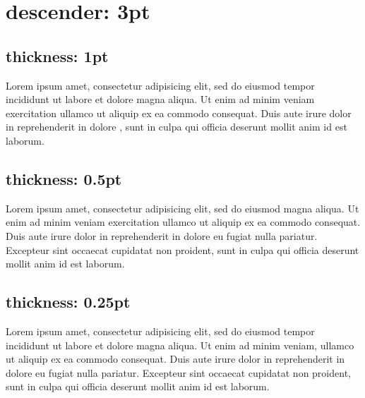 \documentclass{article}
\begin{document}
\section{descender: 3pt}

\subsection{thickness: 1pt}


Lorem ipsum  amet, consectetur adipisicing elit, sed
do eiusmod tempor incididunt ut labore et dolore magna aliqua. Ut enim
ad minim veniam exercitation ullamco  ut aliquip ex
ea commodo consequat. Duis aute irure dolor in reprehenderit in
 dolore , sunt in culpa
qui officia deserunt mollit anim id est laborum.

\subsection{thickness: 0.5pt}


Lorem ipsum  amet, consectetur adipisicing elit, sed
do eiusmod  magna aliqua.
Ut enim ad minim veniam exercitation ullamco  ut
aliquip ex ea commodo consequat. Duis aute irure dolor in reprehenderit
in  dolore eu fugiat nulla pariatur.
Excepteur sint occaecat cupidatat non proident, sunt in culpa qui
officia deserunt mollit anim id est laborum.

\subsection{thickness: 0.25pt}


Lorem ipsum  amet, consectetur adipisicing elit, sed
do eiusmod tempor incididunt ut labore et dolore magna aliqua. Ut enim
ad minim veniam, ullamco  ut aliquip
ex ea commodo consequat. Duis aute irure dolor in reprehenderit in
 dolore eu fugiat nulla pariatur.
Excepteur sint occaecat cupidatat non proident, sunt in culpa qui
officia deserunt mollit anim id est laborum.
\end{document}
